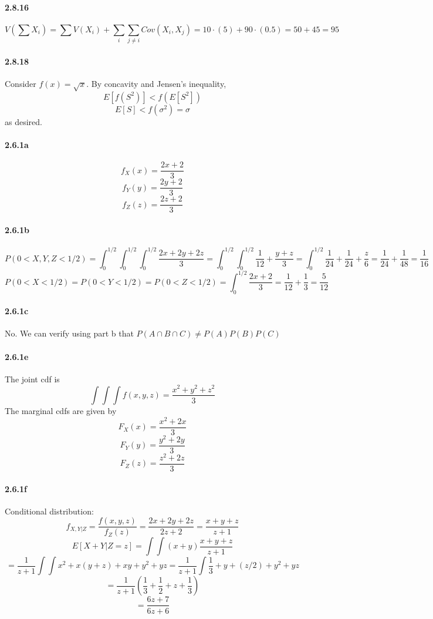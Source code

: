 \documentclass[10pt,letter]{article}
\begin{document}
\paragraph{2.8.16}
\[V\left( \sum X_i \right) = \sum V(X_i) + \sum_i\sum_{j\neq i} Cov(X_i, X_j) = 10\cdot(5) + 90\cdot(0.5) = 50 + 45 = 95 \]
\paragraph{2.8.18}
Consider $f(x) = \sqrt{x}$. By concavity and Jensen's inequality,
\[ E[f(S^2)] < f(E[S^2]) \]
\[ E[S] < f(\sigma^2) = \sigma \]
as desired.
\paragraph{2.6.1a}
\[ f_X(x) = \frac{2x + 2}{3} \]
\[ f_Y(y) = \frac{2y + 2}{3} \]
\[ f_Z(z) = \frac{2z + 2}{3} \]
\paragraph{2.6.1b}
\[ P(0 < X,Y,Z < 1/2) = \int_0^{1/2}\int_0^{1/2}\int_0^{1/2} \frac{2x + 2y + 2z}{3} = \int_0^{1/2}\int_0^{1/2} \frac{1}{12} + \frac{y + z}{3} = \int_0^{1/2} \frac{1}{24} + \frac{1}{24} + \frac{z}{6} = \frac{1}{24} + \frac{1}{48} = \frac{1}{16} \]
\[ P(0 < X < 1/2) = P(0 < Y < 1/2) = P(0 < Z < 1/2) = \int_0^{1/2} \frac{2x + 2}{3} = \frac{1}{12} +\frac{1}{3} = \frac{5}{12} \]
\paragraph{2.6.1c}
No. We can verify using part b that $P(A \cap B \cap C) \neq P(A)P(B)P(C)$
\paragraph{2.6.1e}
The joint cdf is
\[ \int\int\int f(x,y,z) = \frac{x^2 + y^2 + z^2}{3}\]
The marginal cdfs are given by
\[ F_X(x) = \frac{x^2 + 2x}{3} \]
\[ F_Y(y) = \frac{y^2 + 2y}{3} \]
\[ F_Z(z) = \frac{z^2 + 2z}{3} \]
\paragraph{2.6.1f}
Conditional distribution:
\[ f_{X,Y|Z} = \frac{f(x,y,z)}{f_Z(z)} = \frac{2x + 2y + 2z}{2z + 2} = \frac{x+y+z}{z+1} \]
\[ E[X + Y |Z = z ] = \int \int (x+y)\frac{x + y + z}{z + 1} \]
\[ = \frac{1}{z + 1} \int \int x^2 + x(y + z) + xy + y^2 + yz = \frac{1}{z+1}\int \frac{1}{3} + y + (z/2) + y^2 + yz \]
\[ = \frac{1}{z+1} \left(\frac{1}{3} + \frac{1}{2} + z + \frac{1}{3} \right) \]
\[ = \frac{6z + 7}{6z + 6}\]
\end{document}

